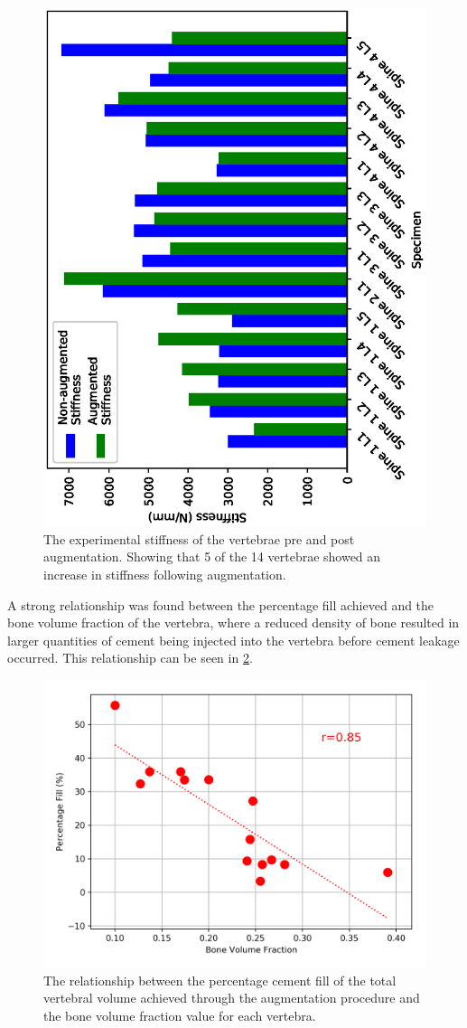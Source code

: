 \begin{figure}[h!]
  \centering
  \includegraphics[width=.7\textwidth,angle=270]{Chapters/Chapter_HT_images/aug_non_aug_stiffness}
	\caption{The experimental stiffness of the vertebrae pre and post augmentation. Showing that 5 of the 14 vertebrae showed an increase in stiffness following augmentation.}
  \label{fig:aug_non_aug_stiffness}
\end{figure}

A strong relationship was found between the percentage fill achieved and the bone volume fraction of the vertebra, where a reduced density of bone resulted in larger quantities of cement being injected into the vertebra before cement leakage occurred.
This relationship can be seen in \cref{fig:cmt_fill_vs_bvtv}.

\begin{figure}[ht!]
  \centering
  \includegraphics[width=.7\textwidth]{Chapters/Chapter_HT_images/cmt_fill_vs_bvtv.png}
	\caption{The relationship between the percentage cement fill of the total vertebral volume  achieved through the augmentation procedure and the bone volume fraction value for each vertebra. }
  \label{fig:cmt_fill_vs_bvtv}
\end{figure}

